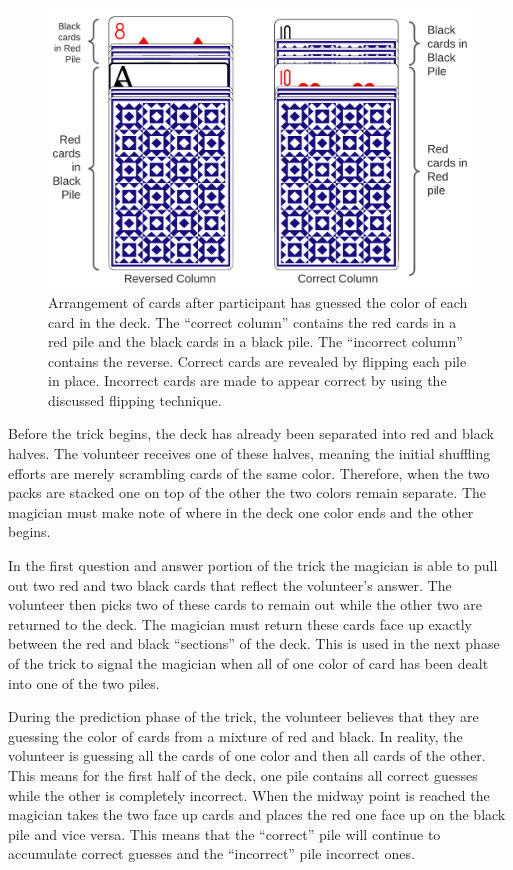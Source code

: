 \begin{figure}[H]
\centering
\includegraphics[scale=.6]{images/Trick1}
\caption{Arrangement of cards after participant has guessed the color of each
card in the deck.  The ``correct column'' contains the red cards in a red pile and
the black cards in a black pile.  The ``incorrect column'' contains the reverse.
Correct cards are revealed by flipping each pile in place.  Incorrect cards are
made to appear correct by using the discussed flipping technique.}
\label{fig:trick1}
\end{figure}

Before the trick begins, the deck has already
been separated into red and black halves.
The volunteer receives one of these halves,
meaning
the initial shuffling efforts are merely scrambling
cards of the same color.
Therefore, when the two packs are
stacked one on top of the other the two colors remain
separate.
The magician must make note of where in the deck
one color ends and the other begins.

In the first question and answer portion of the trick the magician is able to
pull out two red and two black cards that reflect the volunteer's answer.  The
volunteer then picks two of these cards to remain out while the other two are
returned to the deck.  The magician must return these cards face
up exactly between the red and black ``sections'' of the deck.
This is used in the next phase of the
trick to signal the magician when all of one color of card
has been dealt into one of the two piles.

During the prediction phase of the trick, the volunteer believes that they are
guessing the color of cards from a mixture of red and black.
In reality,
the volunteer is guessing all the cards of one color and then all cards of
the other.
This means for the first half of the deck, one pile contains all correct
guesses while the other is completely incorrect.
When the midway point is reached the magician takes the two face up cards and places the
red one face up on the black pile and vice versa.
This means that the ``correct'' pile will continue to accumulate correct
guesses and the ``incorrect'' pile incorrect ones.

